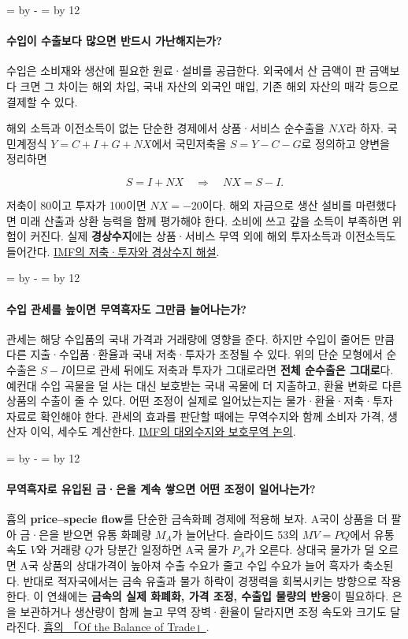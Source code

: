 \documentclass[10pt,a4paper]{article}
\newcommand{\ReserveQuestionSpace}{%
  \par\begingroup
  \dimen0=\pagegoal \advance\dimen0 by -\pagetotal
  \dimen2=\baselineskip \multiply\dimen2 by 12
  \ifdim\dimen0<\dimen2 \newpage\fi
  \endgroup}
\begin{document}
\ReserveQuestionSpace
\paragraph{수입이 수출보다 많으면 반드시 가난해지는가?}
수입은 소비재와 생산에 필요한 원료·설비를 공급한다. 외국에서 산 금액이 판 금액보다 크면 그 차이는 해외 차입, 국내 자산의 외국인 매입, 기존 해외 자산의 매각 등으로 결제할 수 있다.\par

해외 소득과 이전소득이 없는 단순한 경제에서 상품·서비스 순수출을 $NX$라 하자. 국민계정식 $Y=C+I+G+NX$에서 국민저축을 $S=Y-C-G$로 정의하고 양변을 정리하면\par

\[
S=I+NX \quad\Longrightarrow\quad NX=S-I.
\]

저축이 80이고 투자가 100이면 $NX=-20$이다. 해외 자금으로 생산 설비를 마련했다면 미래 산출과 상환 능력을 함께 평가해야 한다. 소비에 쓰고 갚을 소득이 부족하면 위험이 커진다. 실제 \textbf{경상수지}에는 상품·서비스 무역 외에 해외 투자소득과 이전소득도 들어간다. \href{https://www.imf.org/en/publications/fandd/issues/series/back-to-basics/current-account-deficits}{IMF의 저축·투자와 경상수지 해설}.\par

\ReserveQuestionSpace
\paragraph{수입 관세를 높이면 무역흑자도 그만큼 늘어나는가?}
관세는 해당 수입품의 국내 가격과 거래량에 영향을 준다. 하지만 수입이 줄어든 만큼 다른 지출·수입품·환율과 국내 저축·투자가 조정될 수 있다. 위의 단순 모형에서 순수출은 $S-I$이므로 관세 뒤에도 저축과 투자가 그대로라면 \textbf{전체 순수출은 그대로}다. 예컨대 수입 곡물을 덜 사는 대신 보호받는 국내 곡물에 더 지출하고, 환율 변화로 다른 상품의 수출이 줄 수 있다. 어떤 조정이 실제로 일어났는지는 물가·환율·저축·투자 자료로 확인해야 한다. 관세의 효과를 판단할 때에는 무역수지와 함께 소비자 가격, 생산자 이익, 세수도 계산한다. \href{https://www.imf.org/en/publications/fandd/issues/series/back-to-basics/current-account-deficits}{IMF의 대외수지와 보호무역 논의}.\par

\ReserveQuestionSpace
\paragraph{무역흑자로 유입된 금·은을 계속 쌓으면 어떤 조정이 일어나는가?}
흄의 \textbf{price–specie flow}를 단순한 금속화폐 경제에 적용해 보자. A국이 상품을 더 팔아 금·은을 받으면 유통 화폐량 $M_A$가 늘어난다. 슬라이드 53의 $MV=PQ$에서 유통속도 $V$와 거래량 $Q$가 당분간 일정하면 A국 물가 $P_A$가 오른다. 상대국 물가가 덜 오르면 A국 상품의 상대가격이 높아져 수출 수요가 줄고 수입 수요가 늘어 흑자가 축소된다. 반대로 적자국에서는 금속 유출과 물가 하락이 경쟁력을 회복시키는 방향으로 작용한다. 이 연쇄에는 \textbf{금속의 실제 화폐화, 가격 조정, 수출입 물량의 반응}이 필요하다. 은을 보관하거나 생산량이 함께 늘고 무역 장벽·환율이 달라지면 조정 속도와 크기도 달라진다. \href{https://davidhume.org/texts/pld/bt}{흄의 「Of the Balance of Trade」}.\par
\end{document}
